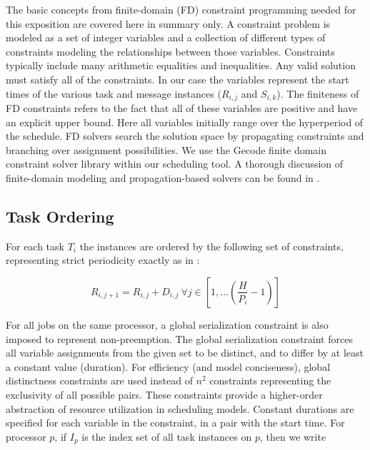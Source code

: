 The basic concepts from finite-domain (FD) constraint programming needed for this exposition are covered 
here in summary only.  A constraint problem is modeled as a set of integer variables and a collection of 
different types of constraints modeling the relationships between those variables.  Constraints typically 
include many arithmetic equalities and inequalities. Any valid solution must satisfy all of the 
constraints. In our case the variables represent the start times of the various task and message instances ($R_{i,j}$ and $S_{i,k}$).  The finiteness of FD constraints refers to the fact that all of these variables are positive and have an explicit upper bound.  Here all variables initially range over the hyperperiod of the schedule.  FD solvers search the solution space by propagating constraints and branching over assignment possibilities.  We use the Gecode finite domain constraint solver library\cite{tools:gecode} within our scheduling tool.  A thorough discussion of finite-domain modeling and propagation-based solvers can be found in \cite{tack2009constraintpropagation}.


\subsection{Task Ordering}

For each task $T_i$ the instances are ordered by the following set of constraints, representing strict 
periodicity exactly as in \cite{sched:offline}:

\begin{equation}
R_{i,j+1}  = R_{i,j} + D_{i,j}\ \forall j \in [1,...(\frac{H}{{P_i}}-1)]
\end{equation}
	  
For all jobs on the same processor, a global serialization constraint is also imposed to represent 
non-preemption.  The global serialization constraint forces all variable assignments from the given set 
to be distinct, and to differ by at least a constant value (duration).  For efficiency (and model 
conciseness), global distinctness constraints are used instead of $n^2$ constraints representing the 
exclusivity of all possible pairs\cite{sched:cumulatives,sched:offline}.  These constraints provide a 
higher-order abstraction of resource utilization in scheduling models\cite{sched:cumulatives}. Constant 
durations are specified for each variable in the constraint, in a pair with the start time.  For 
processor $p$, if $I_p$ is the index set of all task instances on $p$, then we write

